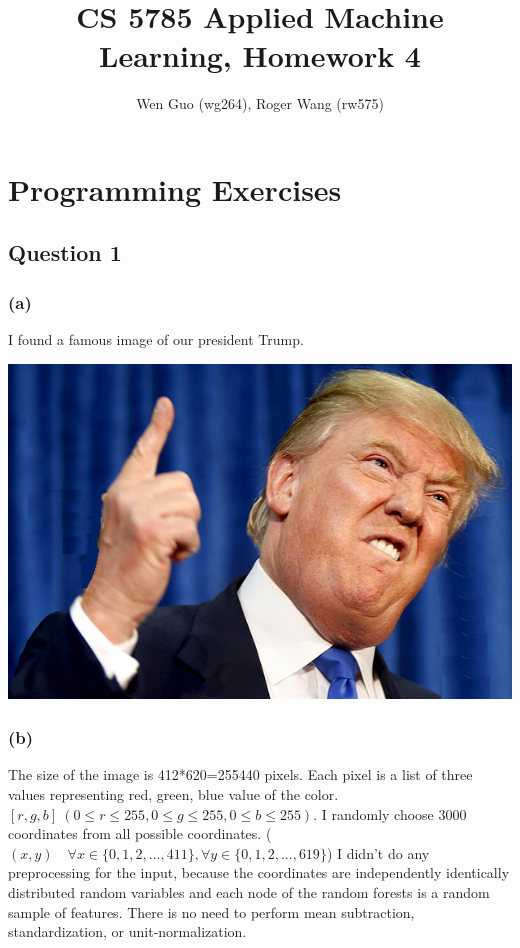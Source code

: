\documentclass[12pt]{article}
\begin{document}
\title{CS 5785 Applied Machine Learning, Homework 4}
\author{Wen Guo (wg264), Roger Wang (rw575)}
\maketitle

{\parindent0pt
\section*{Programming Exercises}
\subsection*{Question 1}
\subsubsection*{(a)}
I found a famous image of our president Trump.

\medskip
\includegraphics[scale=0.2]{P1/Trump.jpg}

\subsubsection*{(b)}
The size of the image is 412*620=255440 pixels. Each pixel is a list of three values representing red, green, blue value of the color. $[r,g,b]\ (0\leqslant r \leqslant 255,0\leqslant g \leqslant 255,0\leqslant b \leqslant 255)$. I randomly choose 3000 coordinates from all possible coordinates. ($(x,y) \quad \forall x\in \{0,1,2,...,411\}, \forall y\in \{0,1,2,...,619\} $) I didn't do any preprocessing for the input, because the coordinates are independently identically distributed random variables and each node of the random forests is a random sample of features. There is no need to perform mean subtraction, standardization, or unit-normalization.

}
\end{document}
